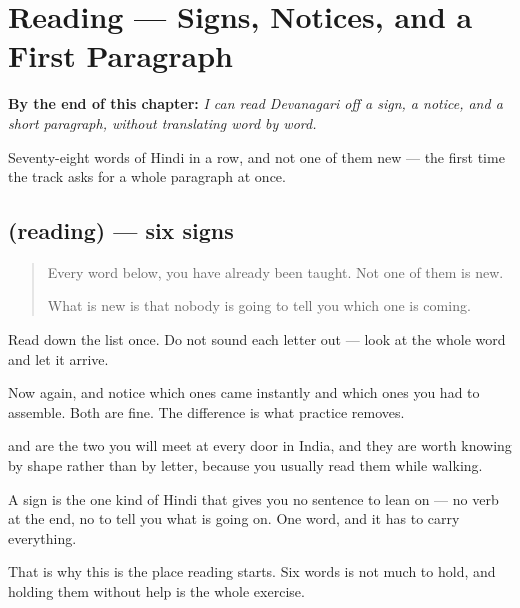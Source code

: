 
\chapter{Reading — Signs, Notices, and a First Paragraph}
\label{ch:hi-pehla-paath}

\begin{chapteropening}
\textbf{By the end of this chapter:} \emph{I can read Devanagari off a sign, a notice, and a short paragraph, without translating word by word.}

Seventy-eight words of Hindi in a row, and not one of them new — the first time the track asks for a whole paragraph at once.
\end{chapteropening}

\section[(reading)]{(reading) — six signs}

\label{lesson:HI-C78-signs}



\begin{quote}
Every word below, you have already been taught. Not one of them is new.

What is new is that nobody is going to tell you which one is coming.
\end{quote}

\begin{tcolorbox}[breakable,skin=enhanced,colback=orange!6,colframe=orange!45!black,boxrule=0.5pt,arc=1mm,left=6pt,right=6pt,top=4pt,bottom=4pt,fonttitle=\bfseries,title={Read this}]
\begin{quote}
     
\end{quote}

Read down the list once. Do not sound each letter out — look at the whole word and let it arrive.

Now again, and notice which ones came instantly and which ones you had to assemble. Both are fine. The difference is what practice removes.
\end{tcolorbox}

\begin{culture}
\textbf{} and \textbf{} are the two you will meet at every door in India, and they are worth knowing by shape rather than by letter, because you usually read them while walking.

A sign is the one kind of Hindi that gives you no sentence to lean on — no verb at the end, no \textbf{} to tell you what is going on. One word, and it has to carry everything.

That is why this is the place reading starts. Six words is not much to hold, and holding them without help is the whole exercise.
\end{culture}

